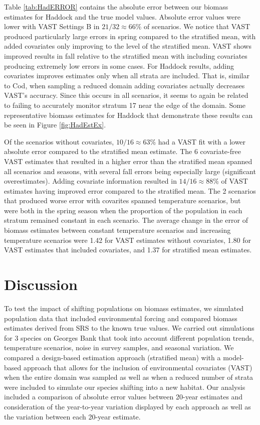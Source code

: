 \documentclass[
  12pt,
]{article}
\begin{document}
Table \ref{tab:HadERROR} contains the absolute error between our biomass estimates for Haddock and the true model values. Absolute error values were lower with VAST Settings B in \(21/32\approx 66\%\) of scenarios. We notice that VAST produced particularly large errors in spring compared to the stratified mean, with added covariates only improving to the level of the stratified mean. VAST shows improved results in fall relative to the stratified mean with including covariates producing extremely low errors in some cases. For Haddock results, adding covariates improves estimates only when all strata are included. That is, similar to Cod, when sampling a reduced domain adding covariates actually decreases VAST's accuracy. Since this occurs in all scenarios, it seems to again be related to failing to accurately monitor stratum 17 near the edge of the domain. Some representative biomass estimates for Haddock that demonstrate these results can be seen in Figure \ref{fig:HadEstEx}.

Of the scenarios without covariates, \(10/16\approx63\)\% had a VAST fit with a lower absolute error compared to the stratified mean estimate. The 6 covariate-free VAST estimates that resulted in a higher error than the stratified mean spanned all scenarios and seasons, with several fall errors being especially large (significant overestimates). Adding covariate information resulted in \(14/16\approx88\)\% of VAST estimates having improved error compared to the stratified mean. The 2 scenarios that produced worse error with covarites spanned temperature scenarios, but were both in the spring season when the proportion of the population in each stratum remained constant in each scenario. The average change in the error of biomass estimates between constant temperature scenarios and increasing temperature scenarios were 1.42 for VAST estimates without covariates, 1.80 for VAST estimates that included covariates, and 1.37 for stratified mean estimates.

\section{Discussion}

To test the impact of shifting populations on biomass estimates, we simulated population data that included environmental forcing and compared biomass estimates derived from SRS to the known true values. We carried out simulations for 3 species on Georges Bank that took into account different population trends, temperature scenarios, noise in survey samples, and seasonal variation. We compared a design-based estimation approach (stratified mean) with a model-based approach that allows for the inclusion of environmental covariates (VAST) when the entire domain was sampled as well as when a reduced number of strata were included to simulate our species shifting into a new habitat. Our analysis included a comparison of absolute error values between 20-year estimates and consideration of the year-to-year variation displayed by each approach as well as the variation between each 20-year estimate.
\end{document}
